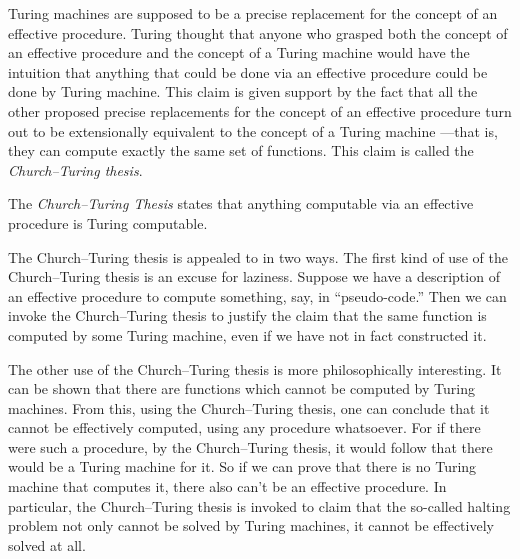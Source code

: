 \documentclass[../../../include/open-logic-section]{subfiles}
\begin{document}

Turing machines are supposed to be a precise replacement for the
concept of an effective procedure. Turing thought that anyone who
grasped both the concept of an effective procedure and the concept
of a Turing machine would have the intuition that anything that could
be done via an effective procedure could be done by Turing machine.
This claim is given support by the fact that all the other proposed
precise replacements for the concept of an effective procedure turn
out to be extensionally equivalent to the concept of a Turing machine
---that is, they can compute exactly the same set of functions. This
claim is called the \emph{Church--Turing thesis}.

\begin{defn}
The \emph{Church--Turing Thesis} states that anything computable via
an effective procedure is Turing computable.
\end{defn}

The Church--Turing thesis is appealed to in two ways.  The first kind
of use of the Church--Turing thesis is an excuse for laziness.  Suppose
we have a description of an effective procedure to compute something,
say, in ``pseudo-code.''  Then we can invoke the Church--Turing thesis
to justify the claim that the same function is computed by some Turing
machine, even if we have not in fact constructed it.

The other use of the Church--Turing thesis is more philosophically
interesting.  It can be shown that there are functions which cannot be
computed by Turing machines.  From this, using the Church--Turing
thesis, one can conclude that it cannot be effectively computed, using
any procedure whatsoever.  For if there were such a procedure, by the
Church--Turing thesis, it would follow that there would be a Turing
machine for it.  So if we can prove that there is no Turing machine
that computes it, there also can't be an effective procedure.  In
particular, the Church--Turing thesis is invoked to claim that the
so-called halting problem not only cannot be solved by Turing
machines, it cannot be effectively solved at all.
\end{document}
